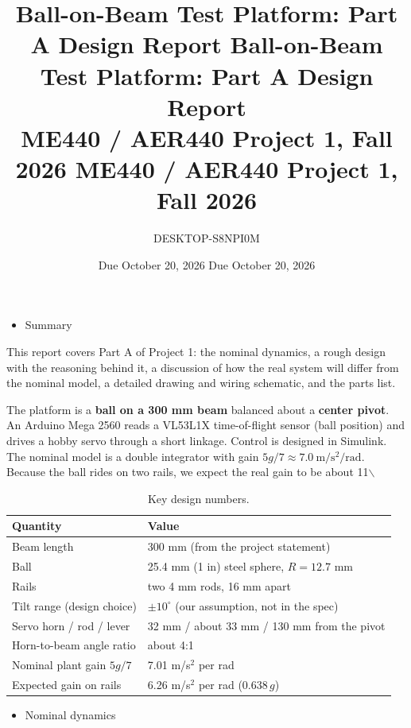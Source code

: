 \documentclass[11pt]{article}
\author{DESKTOP-S8NPI0M}
\date{Due October 20, 2026 Due October 20, 2026}
\title{Ball-on-Beam Test Platform: Part A Design Report Ball-on-Beam Test Platform: Part A Design Report\\\medskip
\large ME440 / AER440 Project 1, Fall 2026 ME440 / AER440 Project 1, Fall 2026}
\begin{document}
\maketitle
\tableofcontents

\begin{itemize}
\item Summary
\end{itemize}
This report covers Part A of Project 1: the nominal dynamics, a rough design with the reasoning behind it, a discussion of how the real system will differ from the nominal model, a detailed drawing and wiring schematic, and the parts list.

The platform is a \textbf{ball on a 300 mm beam} balanced about a \textbf{center pivot}. An Arduino Mega 2560 reads a VL53L1X time-of-flight sensor (ball position) and drives a hobby servo through a short linkage. Control is designed in Simulink. The nominal model is a double integrator with gain \(5g/7 \approx 7.0\ \mathrm{m/s^2/rad}\). Because the ball rides on two rails, we expect the real gain to be about 11$\backslash$%

\begin{table}[htbp]
\caption{\label{tab:keynumbers}Key design numbers.}
\centering
\begin{tabularx}{0.9\textwidth}{lY}
Quantity & Value\\
\hline
Beam length & 300 mm (from the project statement)\\
Ball & 25.4 mm (1 in) steel sphere, \(R = 12.7\) mm\\
Rails & two 4 mm rods, 16 mm apart\\
Tilt range (design choice) & \(\pm 10^\circ\) (our assumption, not in the spec)\\
Servo horn / rod / lever & 32 mm / about 33 mm / 130 mm from the pivot\\
Horn-to-beam angle ratio & about 4:1\\
Nominal plant gain \(5g/7\) & 7.01 m/s\(^2\) per rad\\
Expected gain on rails & 6.26 m/s\(^2\) per rad (\(0.638\,g\))\\
\end{tabularx}
\end{table}

\begin{itemize}
\item Nominal dynamics
\end{itemize}
\end{document}
